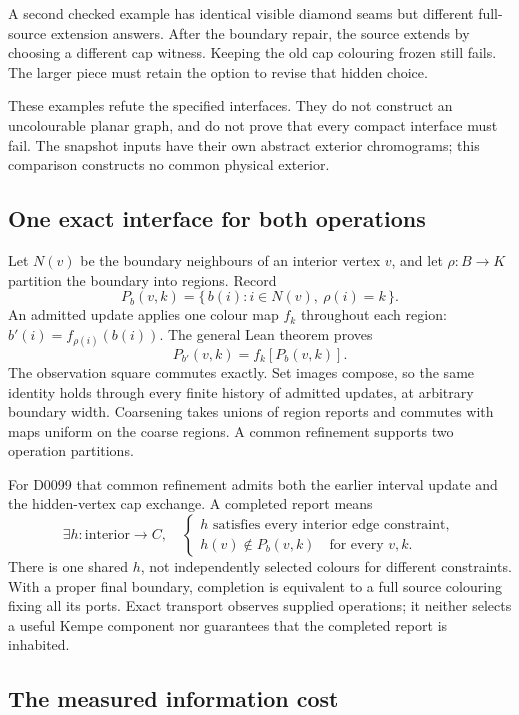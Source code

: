 A second checked example has identical visible diamond seams but
different full-source extension answers. After the boundary repair, the
source extends by choosing a different cap witness. Keeping the old cap
colouring frozen still fails. The larger piece must retain the option to
revise that hidden choice.

These examples refute the specified interfaces. They do not construct an
uncolourable planar graph, and do not prove that every compact interface
must fail. The snapshot inputs have their own abstract exterior
chromograms; this comparison constructs no common physical exterior.

\subsection{One exact interface for both operations}

Let $N(v)$ be the boundary neighbours of an interior vertex $v$, and let
$\rho:B\to K$ partition the boundary into regions. Record
\[
 P_b(v,k)=\{\,b(i):i\in N(v),\ \rho(i)=k\,\}.
\]
An admitted update applies one colour map $f_k$ throughout each region:
$b'(i)=f_{\rho(i)}(b(i))$. The general Lean theorem proves
\[
                         P_{b'}(v,k)=f_k[P_b(v,k)].
\]
The observation square commutes exactly. Set images compose, so the same
identity holds through every finite history of admitted updates, at
arbitrary boundary width. Coarsening takes unions of region reports and
commutes with maps uniform on the coarse regions. A common refinement
supports two operation partitions.

For D0099 that common refinement admits both the earlier interval update
and the hidden-vertex cap exchange. A completed report means
\[
\exists h:\text{interior}\to C,\quad
\begin{cases}
h\text{ satisfies every interior edge constraint},\\
h(v)\notin P_b(v,k)\quad\text{for every }v,k.
\end{cases}
\]
There is one shared $h$, not independently selected colours for different
constraints. With a proper final boundary, completion is equivalent to a
full source colouring fixing all its ports. Exact transport observes
supplied operations; it neither selects a useful Kempe component nor
guarantees that the completed report is inhabited.

\subsection{The measured information cost}

